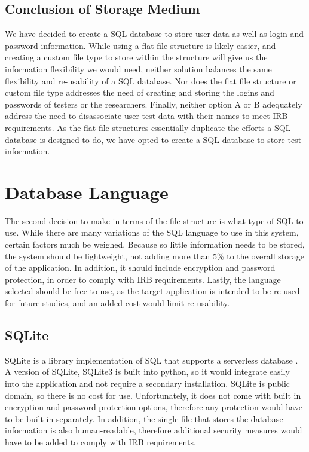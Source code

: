 \documentclass[onecolumn, draftclsnofoot,10pt, compsoc]{report}
\begin{document}
\subsection{Conclusion of Storage Medium}
We have decided to create a SQL database to store user data as well as login and password information. While using a flat file structure is likely easier, and creating a custom file type to store within the structure will give us the information flexibility we would need, neither solution balances the same flexibility and re-usability of a SQL database. Nor does the flat file structure or custom file type addresses the need of creating and storing the logins and passwords of testers or the researchers. Finally, neither option A or B adequately address the need to disassociate user test data with their names to meet IRB requirements. As the flat file structures essentially duplicate the efforts a SQL database is designed to do, we have opted to create a SQL database to store test information.

\section{Database Language}
The second decision to make in terms of the file structure is what type of SQL to use. While there are many variations of the SQL language to use in this system, certain factors much be weighed. Because so little information needs to be stored, the system should be lightweight, not adding more than 5\% to the overall storage of the application. In addition, it should include encryption and password protection, in order to comply with IRB requirements. Lastly, the language selected should be free to use, as the target application is intended to be re-used for future studies, and an added cost would limit re-usability.
\subsection{SQLite}
SQLite is a library implementation of SQL that supports a serverless database \cite{AboutSQLite}. A version of SQLite, SQLite3 is built into python\cite{SQLitePython}, so it would integrate easily into the application and not require a secondary installation. SQLite is public domain, so there is no cost for use. Unfortunately, it does not come with built in encryption and password protection options, therefore any protection would have to be built in separately. In addition, the single file that stores the database information is also human-readable, therefore additional security measures would have to be added to comply with IRB requirements\cite{AboutSQLite, SQLiteTutorial}.
\end{document}
